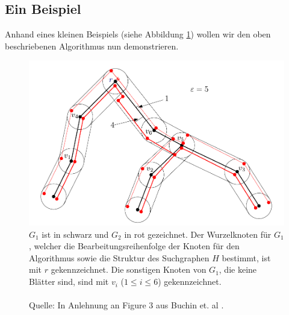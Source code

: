 \documentclass[a4paper, 12pt, twoside]{article}
\theoremstyle{Format1} %
\begin{document}
\subsection{Ein Beispiel}
Anhand eines kleinen Beispiels (siehe Abbildung \ref{min_sum_tree_0}) wollen wir den oben beschriebenen Algorithmus nun demonstrieren.

\begin{figure}[H]
	\includegraphics[width=\textwidth]{min_sum_tree_0.pdf}
	\caption{
	$G_1$ ist in schwarz und $G_2$ in rot gezeichnet. Der Wurzelknoten für $G_1$, welcher die Bearbeitungsreihenfolge der Knoten für den Algorithmus sowie die Struktur
	des Suchgraphen $H$ bestimmt, ist mit $r$ gekennzeichnet. Die sonstigen Knoten von $G_1$, die keine Blätter sind, sind mit $v_i$ ($1 \leq i \leq 6$) gekennzeichnet.
	\\
	\\
	Quelle: In Anlehnung an Figure 3 aus Buchin et. al \cite{Buchin}.
	}
	\label{min_sum_tree_0}
\end{figure}
\end{document}
